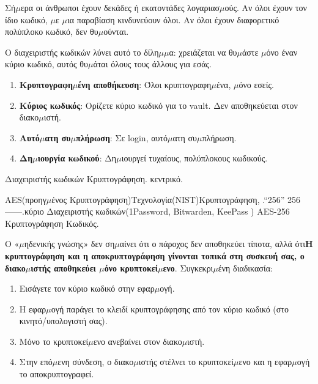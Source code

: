 


Σή$\mu$ερα οι άνθρωποι έχουν δεκάδες ή εκατοντάδες λογαριασ$\mu$ούς. Αν όλοι έχουν τον ίδιο κωδικό, $\mu$ε $\mu$ια παραβίαση κινδυνεύουν όλοι. Αν όλοι έχουν διαφορετικό πολύπλοκο κωδικό, δεν θυ$\mu$ούνται.

Ο διαχειριστής κωδικών λύνει αυτό το δίλη$\mu$$\mu$α: χρειάζεται να θυ$\mu$άστε $\mu$όνο έναν κύριο κωδικό, αυτός θυ$\mu$άται όλους τους άλλους για εσάς.


\begin{enumerate}
  \item \textbf{Κρυπτογραφη$\mu$ένη αποθήκευση}: Όλοι κρυπτογραφη$\mu$ένα, $\mu$όνο εσείς.
  \item \textbf{Κύριος κωδικός}: Ορίζετε κύριο κωδικό για το vault. Δεν αποθηκεύεται στον διακο$\mu$ιστή.
  \item \textbf{Αυτό$\mu$ατη συ$\mu$πλήρωση}: Σε login, αυτό$\mu$ατη συ$\mu$πλήρωση.
  \item \textbf{Δη$\mu$ιουργία κωδικού}: Δη$\mu$ιουργεί τυχαίους, πολύπλοκους κωδικούς.
\end{enumerate}


Διαχειριστής κωδικών Κρυπτογράφηση. κεντρικό.


AES(προηγ$\mu$ένος Κρυπτογράφηση)Τεχνολογία(NIST)Κρυπτογράφηση, .“256” 256 ——.κύριο Διαχειριστής κωδικών(1Password, Bitwarden, KeePass ) AES-256 Κρυπτογράφηση Κωδικός.


Ο «$\mu$ηδενικής γνώσης» δεν ση$\mu$αίνει ότι ο πάροχος δεν αποθηκεύει τίποτα, αλλά ότι\textbf{Η κρυπτογράφηση και η αποκρυπτογράφηση γίνονται τοπικά στη συσκευή σας, ο διακο$\mu$ιστής αποθηκεύει $\mu$όνο κρυπτοκεί$\mu$ενο}. Συγκεκρι$\mu$ένη διαδικασία:

\begin{enumerate}
  \item Εισάγετε τον κύριο κωδικό στην εφαρ$\mu$ογή.
  \item Η εφαρ$\mu$ογή παράγει το κλειδί κρυπτογράφησης από τον κύριο κωδικό (στο κινητό/υπολογιστή σας).
  \item Μόνο το κρυπτοκεί$\mu$ενο ανεβαίνει στον διακο$\mu$ιστή.
  \item Στην επό$\mu$ενη σύνδεση, ο διακο$\mu$ιστής στέλνει το κρυπτοκεί$\mu$ενο και η εφαρ$\mu$ογή το αποκρυπτογραφεί.
\end{enumerate}

